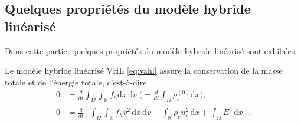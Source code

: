 
\subsection{Quelques propriétés du modèle hybride linéarisé}

Dans cette partie, quelques propriétés du modèle hybride linéarisé sont exhibées. 
\begin{pro}\label{p:vhl_conservation}
  Le modèle hybride linéarisé VHL \eqref{eq:vahl} assure la conservation de la masse totale et de l'énergie totale, c'est-à-dire
  $$
    \begin{aligned}
      0 &= \frac{d}{dt}  \int_\Omega \int_{\mathbb{R}} f_h \mathrm{d}x\,\mathrm{d}v \; \Big( \! = \frac{d}{dt}  \int_\Omega \rho^{(0)}_c \mathrm{d}x\Big), \\
      0 &= \frac{d}{dt} \left[ \int_\Omega \int_{\mathbb{R}} f_h v^2 \,\mathrm{d}x\,\mathrm{d}v+ \int_{\mathbb{R}} \rho_c u_c ^2 \,\mathrm{d}x+  \int_\Omega E^2 \,\mathrm{d}x\right].
    \end{aligned}
  $$
\end{pro}

